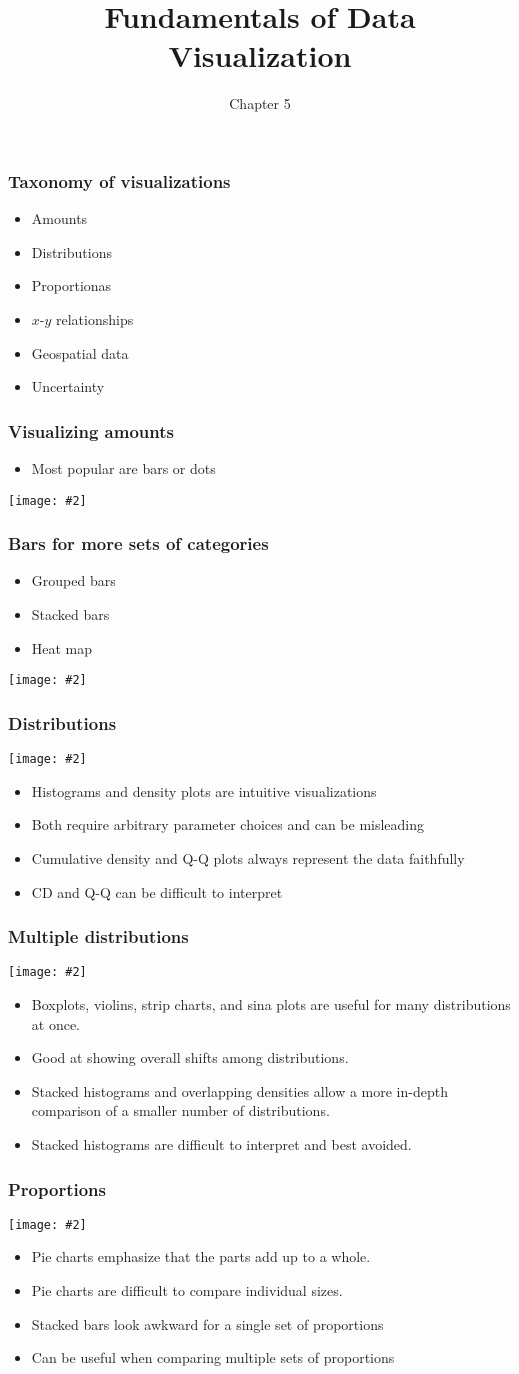 \documentclass{beamer}
\title{Fundamentals of Data Visualization}
\author{Chapter 5}
\newcommand{\bi}{\begin{itemize}}
\newcommand{\li}{\item}
\newcommand{\ei}{\end{itemize}}
\newcommand{\fig}[2]{\centerline{\texttt{[image: \#2]}}}
\newcommand{\bfr}[1]{\begin{frame}[fragile]\frametitle{{ #1 }}}
\begin{document}
\begin{frame}
\maketitle

\end{frame}

\bfr{Taxonomy of visualizations}

\bi
\li Amounts
\li Distributions
\li Proportionas

\li $x$-$y$ relationships
\li Geospatial data
\li Uncertainty
\ei

\end{frame}

\bfr{Visualizing amounts}

\bi
\li Most popular are bars or dots
\ei

\fig{1}{amounts-1.png}

\end{frame}

\bfr{Bars for more sets of categories}
\bi
\li Grouped bars
\li Stacked bars
\li Heat map
\ei

\fig{1}{amounts_multi-1.png}

\end{frame}

\bfr{Distributions}
\fig{1}{single-distributions-1.png}
\bi
\li Histograms and density plots are intuitive visualizations
\li Both require arbitrary parameter choices and can be misleading
\li Cumulative density and Q-Q plots always represent the data faithfully
\li CD and Q-Q can be difficult to interpret
\ei
\end{frame}

\bfr{Multiple distributions}
\fig{.8}{multiple-distributions-1.png}
\small
\bi
\li Boxplots, violins, strip charts, and sina plots are useful for many distributions
at once.
\li Good at showing overall shifts among distributions.
\li Stacked histograms and overlapping densities allow a more in-depth comparison of a smaller number of distributions.
\li Stacked histograms are difficult to interpret and best avoided.
\ei
\end{frame}

\bfr{Proportions}
\fig{1}{proportions-1.png}
\bi
\li Pie charts emphasize that the parts add up to a whole.
\li Pie charts are difficult to compare individual sizes.
\li Stacked bars look awkward for a single set of proportions
\li Can be useful when comparing multiple sets of proportions
\ei
\end{frame}
\end{document}

